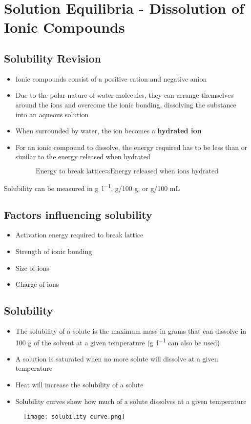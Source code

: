 \section{Solution Equilibria - Dissolution of Ionic Compounds} \label{19/11/2024}
	\subsection{Solubility Revision}
		\begin{itemize}
			\item Ionic compounds consist of a positive cation and negative anion
			\item Due to the polar nature of water molecules, they can arrange themselves around the ions and overcome the ionic bonding, dissolving the substance into an aqueous solution
			\item When surrounded by water, the ion becomes a \textbf{hydrated ion}
			\item For an ionic compound to dissolve, the energy required has to be less than or similar to the energy released when hydrated
		\end{itemize}

		$$\text{Energy to break lattice} \approx \text{Energy released when ions hydrated}$$

		Solubility can be measured in \unit{\gram\per\litre}, g/100 g, or g/100 mL

	\subsection{Factors influencing solubility}
		\begin{itemize}
			\item Activation energy required to break lattice
				\item Strength of ionic bonding
				\item Size of ions
				\item Charge of ions
		\end{itemize}

	\subsection{Solubility}
		\begin{itemize}
			\item The solubility of a solute is the maximum mass in grams that can dissolve in 100 g of the solvent at a given temperature (\unit{\gram\per\litre} can also be used)
			\item A solution is saturated when no more solute will dissolve at a given temperature
			\item Heat will increase the solubility of a solute
			\item Solubility curves show how much of a solute dissolves at a given temperature
		\end{itemize}
		\begin{figure}[H]
			\centering
			\texttt{[image: solubility curve.png]}
		\end{figure}

